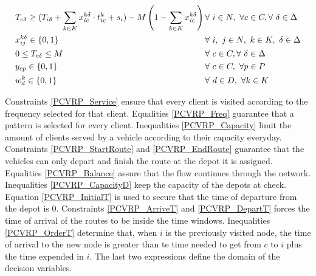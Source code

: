 \documentclass[preprint,review,12pt]{elsarticle}
\begin{document}
\begin{align}
	& T_{c\delta} \geq (T_{i\delta} + \sum\limits_{k \in K}x_{ic}^{k\delta} \cdot t_{ic}^k + s_i) - M \left(1 - \sum\limits_{k \in K}x_{ic}^{k\delta} \right) \qquad && \text{\hspace{-1cm}} \forall \ i \in N,\ \forall c \in C, \forall \ \delta \in \Delta \label{PCVRP_OrderT}\\
	& x_{ij}^{k\delta} \in\{0,1\} && \text{\hspace{-1cm}} \forall \ i, \ j \in N,\ k \in K,\ \delta \in \Delta \label{PCVRP_DomainX}\\
	& 0 \leq T_{c\delta} \leq M && \text{\hspace{-1cm}} \forall \ c \in C, \forall \ \delta \in \Delta \label{PCVRP_DomainT}\\
	& y_{cp} \in\{0,1\} && \text{\hspace{-1cm}} \forall \ c \in C,\ \forall p \in P \label{PCVRP_DomainY}\\
	& w_d^k \in\{0,1\} && \text{\hspace{-1cm}} \forall \ d \in D,\ \forall k \in K \label{PCVRP_DomainW}
\end{align}

Constraints \eqref{PCVRP_Service} ensure that every client is visited according to the frequency selected for that client. Equalities \eqref{PCVRP_Freq} guarantee that a pattern is selected for every client. Inequalities \eqref{PCVRP_Capacity} limit the amount of clients served by a vehicle according to their capacity everyday. Constraints \eqref{PCVRP_StartRoute} and \eqref{PCVRP_EndRoute} guarantee that the vehicles can only depart and finish the route at the depot it is assigned. Equalities \eqref{PCVRP_Balance} assure that the flow continues through the network. Inequalities \eqref{PCVRP_CapacityD} keep the capacity of the depots at check. Equation \eqref{PCVRP_InitialT} is used to secure that the time of departure from the depot is 0. Constraints \eqref{PCVRP_ArriveT} and \eqref{PCVRP_DepartT} forces the time of arrival of the routes to be inside the time windows. Inequalities \eqref{PCVRP_OrderT} determine that, when $i$ is the previously visited node, the time of arrival to the new node is greater than te time needed to get from $c$ to $i$ plus the time expended in $i$. The last two expressions define the domain of the decision variables.
\end{document}
